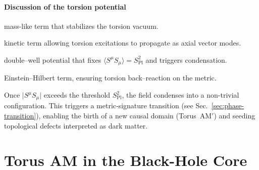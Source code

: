 \documentclass{article}
\newcommand{\Splanck}{S_{\mathrm{Pl}}}
\begin{document}
\paragraph{Discussion of the torsion potential}
\begin{description}[leftmargin=2em]
  \item[\(\tfrac{\alpha}{2} S_\mu S^\mu\)] mass-like term that stabilizes the torsion vacuum.
  \item[\(\tfrac{\beta}{2}(\nabla_{[\mu} S_{\nu]})^2\)] kinetic term allowing torsion excitations to propagate as axial vector modes.
  \item[\(\tfrac{\lambda}{4}(S^\mu S_\mu - \Splanck^2)^2\)] double–well potential that fixes \(\langle S^\mu S_\mu \rangle = \Splanck^2\) and triggers condensation.
  \item[\(\tfrac1{2\kappa}R\)] Einstein–Hilbert term, ensuring torsion back–reaction on the metric.
  \item[Physical role] Once \(\vert S^\mu S_\mu \vert\) exceeds the threshold \(\Splanck^2\), the field condenses into a non-trivial configuration. This triggers a metric‐signature transition (see Sec.~\ref{sec:phase-transition}), enabling the birth of a new causal domain (Torus~AM$'$) and seeding topological defects interpreted as dark matter.
\end{description}

\medskip
\begin{center}
\end{center}
\medskip





\section{Torus AM in the Black-Hole Core}
\label{sec:torus-core}
\label{sec:torus-stability}
\end{document}
